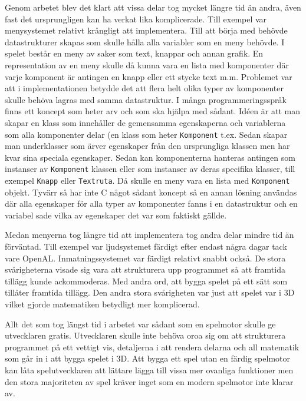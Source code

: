\documentclass[12pt, a4paper]{article}
\newcommand{\code}{\texttt}
\begin{document}
	Genom arbetet blev det klart att vissa delar tog mycket längre tid än andra, även fast det ursprungligen kan ha verkat lika komplicerade. Till exempel var menysystemet relativt krångligt att implementera. Till att börja med behövde datastrukturer skapas som skulle hålla alla variabler som en meny behövde. I spelet består en meny av saker som text, knappar och annan grafik. En representation av en meny skulle då kunna vara en lista med komponenter där varje komponent är antingen en knapp eller ett stycke text m.m. Problemet var att i implementationen betydde det att flera helt olika typer av komponenter skulle behöva lagras med samma datastruktur. I många programmeringsspråk finns ett koncept som heter arv och som ska hjälpa med sådant. Idéen är att man skapar en klass som innehåller de gemensamma egenskaperna och variablerna som alla komponenter delar (en klass som heter \code{Komponent} t.ex. Sedan skapar man underklasser som ärver egenskaper från den ursprungliga klassen men har kvar sina speciala egenskaper. Sedan kan komponenterna hanteras antingen som instanser av \code{Komponent} klassen eller som instanser av deras specifika klasser, till exempel \code{Knapp} eller \code{Textruta}. Då skulle en meny vara en lista med \code{Komponent} objekt. Tyvärr så har inte C något sådant koncept så en annan lösning användas där alla egenskaper för alla typer av komponenter fanns i en datastruktur och en variabel sade vilka av egenskaper det var som faktiskt gällde. 
	
	Medan menyerna tog längre tid att implementera tog andra delar mindre tid än förväntad. Till exempel var ljudsystemet färdigt efter endast några dagar tack vare OpenAL. Inmatningssystemet var färdigt relativt snabbt också. De stora svårigheterna visade sig vara att strukturera upp programmet så att framtida tillägg kunde ackommoderas. Med andra ord, att bygga spelet på ett sätt som tillåter framtida tillägg. Den andra stora svårigheten var just att spelet var i 3D vilket gjorde matematiken betydligt mer komplicerad. 
	
	Allt det som tog längst tid i arbetet var sådant som en spelmotor skulle ge utvecklaren gratis. Utvecklaren skulle inte behöva oroa sig om att strukturera programmet på ett vettigt vis, detaljerna i att rendera delarna och all matematik som går in i att bygga spelet i 3D. Att bygga ett spel utan en färdig spelmotor kan låta spelutvecklaren att lättare lägga till vissa mer ovanliga funktioner men den stora majoriteten av spel kräver inget som en modern spelmotor inte klarar av. 
	
\end{document}
